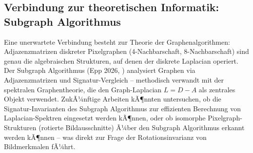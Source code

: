 ﻿\documentclass[a4paper,12pt]{article}
\theoremstyle{definition}
\begin{document}
\subsection{Verbindung zur theoretischen Informatik: Subgraph Algorithmus}

Eine unerwartete Verbindung besteht zur Theorie der Graphenalgorithmen: Adjazenzmatrizen
diskreter Pixelgraphen (4-Nachbarschaft, 8-Nachbarschaft) sind genau die algebraischen Strukturen,
auf denen der diskrete Laplacian operiert. Der Subgraph Algorithmus (Epp 2026, \cite{epp2026})
analysiert Graphen via Adjazenzmatrizen und Signatur-Vergleich -- methodisch verwandt mit der
spektralen Graphentheorie, die den Graph-Laplacian $L = D - A$ als zentrales Objekt verwendet.
ZukÃ¼nftige Arbeiten kÃ¶nnten untersuchen, ob die Signatur-Invarianten des Subgraph Algorithmus
zur effizienten Berechnung von Laplacian-Spektren eingesetzt werden kÃ¶nnen, oder ob isomorphe
Pixelgraph-Strukturen (rotierte Bildausschnitte) Ã¼ber den Subgraph Algorithmus erkannt werden
kÃ¶nnen -- was direkt zur Frage der Rotationsinvarianz von Bildmerkmalen fÃ¼hrt.
\end{document}
